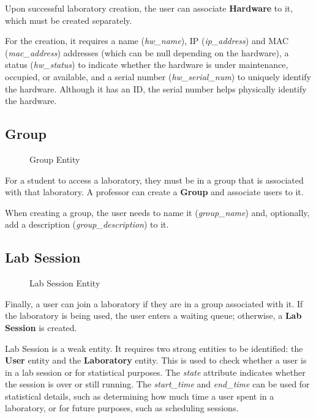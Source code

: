 Upon successful laboratory creation, the user can associate \textbf{Hardware} to it, which must be created separately.

For the creation, it requires a name (\textit{hw\_name}), IP (\textit{ip\_address}) and MAC (\textit{mac\_address}) addresses (which can be null depending on the hardware), a status (\textit{hw\_status}) to indicate whether the hardware is under maintenance, occupied, or available, and a serial number (\textit{hw\_serial\_num}) to uniquely identify the hardware. Although it has an ID, the serial number helps physically identify the hardware.    

\subsection*{Group}

\begin{figure}[H]
    \begin{center}
        \resizebox{9cm}{!}{}
    \end{center}
    \caption{Group Entity}
    \label{fig:group_entity}
\end{figure}

For a student to access a laboratory, they must be in a group that is associated with that laboratory. A professor can create a \textbf{Group} and associate users to it.

When creating a group, the user needs to name it (\textit{group\_name}) and, optionally, add a description (\textit{group\_description}) to it.

\subsection*{Lab Session}

\begin{figure}[H]
    \begin{center}
        \resizebox{7.5cm}{!}{}
    \end{center}
    \caption{Lab Session Entity}
    \label{fig:lab_session_entity}
\end{figure}

Finally, a user can join a laboratory if they are in a group associated with it. If the laboratory is being used, the user enters a waiting queue; otherwise, a \textbf{Lab Session} is created.

Lab Session is a weak entity. It requires two strong entities to be identified: the \textbf{User} entity and the \textbf{Laboratory} entity. This is used to check whether a user is in a lab session or for statistical purposes. The \textit{state} attribute indicates whether the session is over or still running. The \textit{start\_time} and \textit{end\_time} can be used for statistical details, such as determining how much time a user spent in a laboratory, or for future purposes, such as scheduling sessions.

